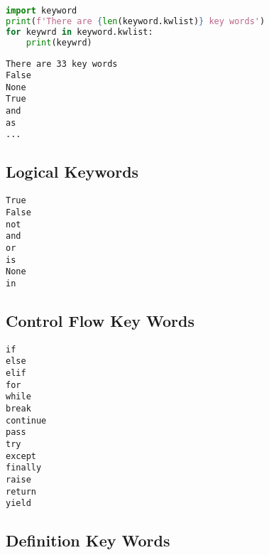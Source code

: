 \documentclass{book}
\newenvironment{key_terms}{\begin{multicols}{3}}{\end{multicols}} %
\begin{document}
    
        \begin{lstlisting}[language=Python]
import keyword
print(f'There are {len(keyword.kwlist)} key words')
for keywrd in keyword.kwlist:
    print(keywrd)
\end{lstlisting}

\begin{lstlisting}
There are 33 key words
False
None
True
and
as
...
\end{lstlisting}
    




    
        \hypertarget{logical-keywords}{%
\subsection{Logical Keywords}\label{logical-keywords}}
    




    
        \begin{key_terms}
        \begin{lstlisting}
True
False
not
and
or
is
None
in
\end{lstlisting}
        \end{key_terms}

    




    
        \hypertarget{control-flow-key-words}{%
\subsection{Control Flow Key Words}\label{control-flow-key-words}}
    




    
        \begin{key_terms}
        \begin{lstlisting}
if
else
elif
for
while
break
continue
pass
try
except
finally
raise
return
yield
\end{lstlisting}
        \end{key_terms}

    




    
        \hypertarget{definition-key-words}{%
\subsection{Definition Key Words}\label{definition-key-words}}
    
\end{document}
